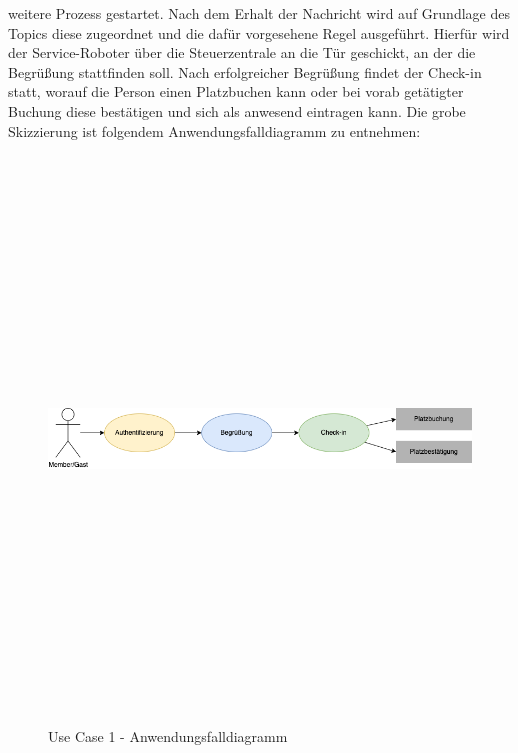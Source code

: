     weitere Prozess gestartet. Nach dem Erhalt der Nachricht wird auf Grundlage des Topics diese zugeordnet und die dafür 
    vorgesehene Regel ausgeführt. Hierfür wird der Service-Roboter über die Steuerzentrale an die Tür geschickt, an der die Begrüßung 
    stattfinden soll. Nach erfolgreicher Begrüßung findet der Check-in statt, worauf die Person einen Platzbuchen kann oder bei vorab getätigter 
    Buchung diese bestätigen und sich als anwesend eintragen kann. Die grobe Skizzierung ist folgendem Anwendungsfalldiagramm zu entnehmen: 
    \begin{figure}[hbt!]
        \centering
        \includegraphics[width=15cm,height=15cm,keepaspectratio]{images/UC1_Diagramm_Check-in.png}
        \caption{Use Case 1 - Anwendungsfalldiagramm}
        \label{fig:uc1-check-in}
    \end{figure}

